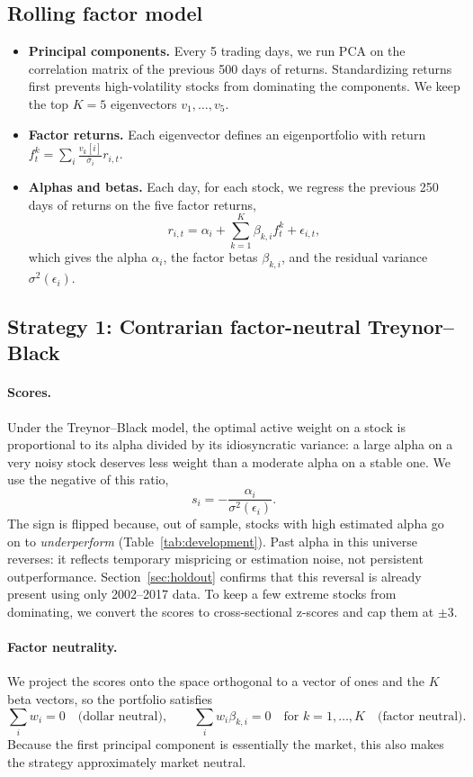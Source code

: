 \documentclass[12pt,letterpaper]{article}
\begin{document}
\subsection{Rolling factor model}

\begin{itemize}
    \item \textbf{Principal components.} Every 5 trading days, we run PCA on the correlation matrix of the previous 500 days of returns. Standardizing returns first prevents high-volatility stocks from dominating the components. We keep the top $K = 5$ eigenvectors $v_1, \dots, v_5$.
    \item \textbf{Factor returns.} Each eigenvector defines an eigenportfolio with return $f^k_t = \sum_i \frac{v_k[i]}{\bar\sigma_i} r_{i,t}$.
    \item \textbf{Alphas and betas.} Each day, for each stock, we regress the previous 250 days of returns on the five factor returns,
    \[
        r_{i,t} = \alpha_i + \sum_{k=1}^{K} \beta_{k,i} f^k_t + \epsilon_{i,t},
    \]
    which gives the alpha $\alpha_i$, the factor betas $\beta_{k,i}$, and the residual variance $\sigma^2(\epsilon_i)$.
\end{itemize}

\subsection{Strategy 1: Contrarian factor-neutral Treynor--Black}

\paragraph{Scores.} Under the Treynor--Black model, the optimal active weight on a stock is proportional to its alpha divided by its idiosyncratic variance: a large alpha on a very noisy stock deserves less weight than a moderate alpha on a stable one. We use the negative of this ratio,
\[
    s_i = -\frac{\alpha_i}{\sigma^2(\epsilon_i)}.
\]
The sign is flipped because, out of sample, stocks with high estimated alpha go on to \emph{underperform} (Table~\ref{tab:development}). Past alpha in this universe reverses: it reflects temporary mispricing or estimation noise, not persistent outperformance. Section~\ref{sec:holdout} confirms that this reversal is already present using only 2002--2017 data. To keep a few extreme stocks from dominating, we convert the scores to cross-sectional z-scores and cap them at $\pm 3$.

\paragraph{Factor neutrality.} We project the scores onto the space orthogonal to a vector of ones and the $K$ beta vectors, so the portfolio satisfies
\[
    \sum_i w_i = 0 \quad \text{(dollar neutral)}, \qquad \sum_i w_i \beta_{k,i} = 0 \quad \text{for } k = 1, \dots, K \quad \text{(factor neutral)}.
\]
Because the first principal component is essentially the market, this also makes the strategy approximately market neutral.
\end{document}
